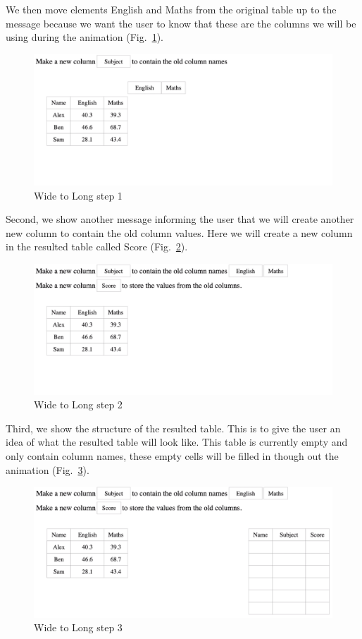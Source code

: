 We then move elements English and Maths from the original table up to the message because we want the user to know that these are the columns we will be using during the animation (Fig.~\ref{fig:gather1}).
\begin{figure}[H]
    \includegraphics[scale = 0.35]{Masters-Thesis/img/gather1.png}
    \caption{Wide to Long step 1}
    \label{fig:gather1}
\end{figure}

Second, we show another message informing the user that we will create another new column to contain the old column values. Here we will create a new column in the resulted table called Score (Fig.~\ref{fig:gather2}).
\begin{figure}[H]
    \includegraphics[scale = 0.35]{Masters-Thesis/img/gather2.png}
    \caption{Wide to Long step 2}
    \label{fig:gather2}
\end{figure}

\newpage
Third, we show the structure of the resulted table. This is to give the user an idea of what the resulted table will look like. This table is currently empty and only contain column names, these empty cells will be filled in though out the animation (Fig.~\ref{fig:gather3}).
\begin{figure}[H]
    \includegraphics[scale = 0.35]{Masters-Thesis/img/gather3.png}
    \caption{Wide to Long step 3}
    \label{fig:gather3}
\end{figure}

